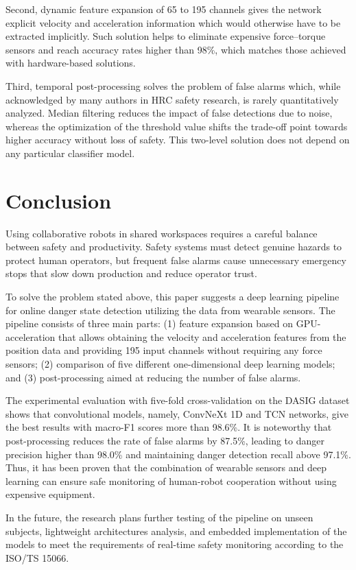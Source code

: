 \documentclass[a4paper,fleqn]{cas-sc}
\begin{document}
Second, dynamic feature expansion of 65 to 195 channels gives the network explicit velocity and acceleration information which would otherwise have to be extracted implicitly. Such solution helps to eliminate expensive force–torque sensors and reach accuracy rates higher than 98\%, which matches those achieved with hardware-based solutions.

Third, temporal post-processing solves the problem of false alarms which, while acknowledged by many authors in HRC safety research, is rarely quantitatively analyzed. Median filtering reduces the impact of false detections due to noise, whereas the optimization of the threshold value shifts the trade-off point towards higher accuracy without loss of safety. This two-level solution does not depend on any particular classifier model.

\section{Conclusion}\label{sec:conclusion}

Using collaborative robots in shared workspaces requires a careful balance between safety and productivity. Safety systems must detect genuine hazards to protect human operators, but frequent false alarms cause unnecessary emergency stops that slow down production and reduce operator trust.

To solve the problem stated above, this paper suggests a deep learning pipeline for online danger state detection utilizing the data from wearable sensors. The pipeline consists of three main parts: (1) feature expansion based on GPU-acceleration that allows obtaining the velocity and acceleration features from the position data and providing 195 input channels without requiring any force sensors; (2) comparison of five different one-dimensional deep learning models; and (3) post-processing aimed at reducing the number of false alarms.

The experimental evaluation with five-fold cross-validation on the DASIG dataset shows that convolutional models, namely, ConvNeXt 1D and TCN networks, give the best results with macro-F1 scores more than 98.6\%. It is noteworthy that post-processing reduces the rate of false alarms by 87.5\%, leading to danger precision higher than 98.0\% and maintaining danger detection recall above 97.1\%. Thus, it has been proven that the combination of wearable sensors and deep learning can ensure safe monitoring of human-robot cooperation without using expensive equipment.

In the future, the research plans further testing of the pipeline on unseen subjects, lightweight architectures analysis, and embedded implementation of the models to meet the requirements of real-time safety monitoring according to the ISO/TS 15066.

\printcredits



\end{document}
